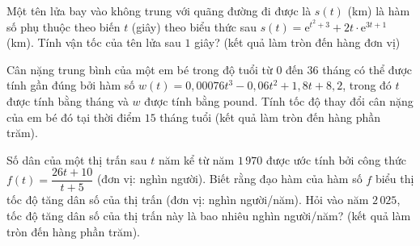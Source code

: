 \begin{ex}%
	Một tên lửa bay vào không trung với quãng đường đi được là $s(t)$ (km) là hàm số phụ thuộc theo biến $t$ (giây) theo biểu thức sau $s(t)=\mathrm{e}^{t^2+3}+2t\cdot{\mathrm{e}^{3t+1}}$ (km). Tính vận tốc của tên lửa sau $ 1 $ giây? (kết quả làm tròn đến hàng đơn vị) 
\end{ex}

\begin{ex}%
	Cân nặng trung bình của một em bé trong độ tuổi từ $ 0 $ đến $ 36 $ tháng có thể được tính  gần đúng bởi hàm số $w(t)=0{,}00076t^3-0{,}06t^2+1{,}8t+8{,}2$, trong đó $t$ được tính bằng tháng và $w$ được tính bằng pound. Tính tốc độ thay đổi cân nặng của em bé đó tại thời điểm $ 15 $ tháng tuổi (kết quả làm tròn đến hàng phần trăm).
\end{ex}

\begin{ex}%
	Số dân của một thị trấn sau $ t $ năm kể từ năm $ 1\,970 $ được ước tính bởi công thức $f(t)=\dfrac{26t+10}{t+5}$ (đơn vị: nghìn người). Biết rằng đạo hàm của hàm số $f$ biểu thị tốc độ tăng dân số của thị trấn (đơn vị: nghìn người/năm). Hỏi vào năm $ 2\,025 $, tốc độ tăng dân  số của thị trấn này là bao nhiêu nghìn người/năm? (kết quả làm tròn đến hàng phần trăm).
\end{ex}

